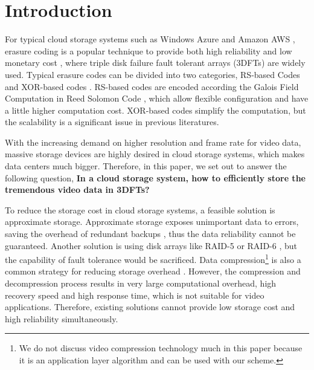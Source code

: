 \documentclass[sigconf]{acmart}
\begin{document}
\maketitle

\section{Introduction}
For typical cloud storage systems such as Windows Azure \cite{calder2011windows} and Amazon AWS \cite{bermudez2013exploring}, erasure coding is a popular technique to provide both high reliability and low monetary cost \cite{EVENODD, RDP, BlaumRoth, XCode, CRS, TripleStar, TPtech, RSL}, where triple disk failure fault tolerant arrays (3DFTs) are widely used. Typical erasure codes can be divided into two categories, RS-based Codes \cite{RS} \cite{LRC} and XOR-based codes \cite{EVENODD, hcode, STAR, tip}. RS-based codes are encoded according the Galois Field Computation in Reed Solomon Code \cite{RS}, which allow flexible configuration and have a little higher computation cost. XOR-based codes simplify the computation, but the scalability is a significant issue in previous literatures.

With the increasing demand on higher resolution and frame rate for video data, massive storage devices are highly desired in cloud storage systems, which makes data centers much bigger.
Therefore, in this paper, we set out to answer the following question,
\textbf{In a cloud storage system, how to efficiently store the tremendous video data in 3DFTs?}


To reduce the storage cost in cloud storage systems, a feasible solution is approximate storage. Approximate storage exposes unimportant data to errors, saving the overhead of redundant backups \cite{niklaus2018context, sampson2014approximate} , thus the data reliability cannot be guaranteed.
Another solution is using disk arrays like RAID-5 or RAID-6 \cite{RAID}, but the capability of fault tolerance would be sacrificed.
Data compression\footnote{We do not discuss video compression technology much in this paper because it is an application layer algorithm and can be used with our scheme.} is also a common strategy for reducing storage overhead \cite{ziv1977universal, ziv1978compression, deutsch1996deflate}. However, the compression and decompression process results in very large computational overhead, high recovery speed and high response time, which is not suitable for video applications.
Therefore, existing solutions cannot provide low storage cost and high reliability simultaneously.
\end{document}

